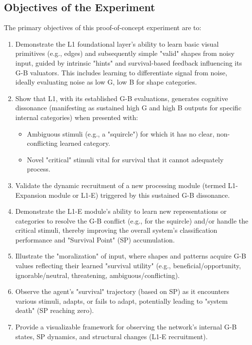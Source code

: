 \documentclass{article}
\begin{document}
\subsection{Objectives of the Experiment}
The primary objectives of this proof-of-concept experiment are to:
\begin{enumerate}
    \item Demonstrate the L1 foundational layer's ability to learn basic visual primitives (e.g., edges) and subsequently simple "valid" shapes from noisy input, guided by intrinsic "hints" and survival-based feedback influencing its G-B valuators. This includes learning to differentiate signal from noise, ideally evaluating noise as low G, low B for shape categories.
    \item Show that L1, with its established G-B evaluations, generates cognitive dissonance (manifesting as sustained high G and high B outputs for specific internal categories) when presented with:
    \begin{itemize}
        \item Ambiguous stimuli (e.g., a "squircle") for which it has no clear, non-conflicting learned category.
        \item Novel "critical" stimuli vital for survival that it cannot adequately process.
    \end{itemize}
    \item Validate the dynamic recruitment of a new processing module (termed L1-Expansion module or L1-E) triggered by this sustained G-B dissonance.
    \item Demonstrate the L1-E module's ability to learn new representations or categories to resolve the G-B conflict (e.g., for the squircle) and/or handle the critical stimuli, thereby improving the overall system's classification performance and "Survival Point" (SP) accumulation.
    \item Illustrate the "moralization" of input, where shapes and patterns acquire G-B values reflecting their learned "survival utility" (e.g., beneficial/opportunity, ignorable/neutral, threatening, ambiguous/conflicting).
    \item Observe the agent's "survival" trajectory (based on SP) as it encounters various stimuli, adapts, or fails to adapt, potentially leading to "system death" (SP reaching zero).
    \item Provide a visualizable framework for observing the network's internal G-B states, SP dynamics, and structural changes (L1-E recruitment).
\end{enumerate}
\end{document}
